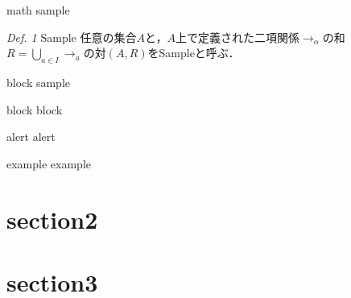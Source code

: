 \documentclass[aspectratio=1610,dvipdfmx,ja=standard]{beamer}
\begin{document}
\begin{frame}{math sample}
    \begin{block}{\textit{Def. 1} Sample}
        任意の集合$A$と，$A$上で定義された二項関係$\to_{\alpha}$の和$R = \bigcup_{a \in I} \to_a $の対$(A, R)$をSampleと呼ぶ．
    \end{block}
\end{frame}

\begin{frame}{block sample}
    \begin{block}{block}
        block
    \end{block}
    \begin{alertblock}{alert}
        alert
    \end{alertblock}
    \begin{exampleblock}{example}
        example
    \end{exampleblock}
\end{frame}

\section{section2}

\begin{frame}
    \tableofcontents[currentsection]
\end{frame}
%
\section{section3}

\begin{frame}
    \tableofcontents[currentsection]
\end{frame}
%
%
%
%
\end{document}
